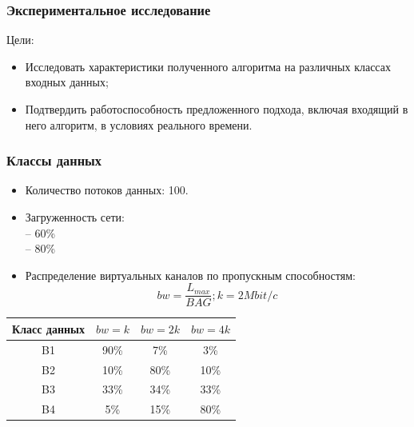 \documentclass[14pt, handout]{beamer}
\begin{document}
\begin{frame}
\frametitle{Экспериментальное исследование}

Цели:
\begin{itemize}
\item Исследовать характеристики полученного алгоритма на различных классах входных данных; 
\item Подтвердить работоспособность предложенного подхода, включая входящий в него алгоритм, в условиях реального времени.
\end{itemize}

\end{frame}


\begin{frame}
\frametitle{Классы данных}

\begin{itemize}
\item Количество потоков данных: 100.
\item Загруженность сети:\\
	-- 60\% \\
	-- 80\%
\item Распределение виртуальных каналов по пропускным способностям: $$bw = \frac{L_{max}}{BAG}; k = 2 Mbit/c$$
\end{itemize}
\begin{table}[h]
	\small
	\begin{center}
		\begin{tabular}{|c|c|c|c|}
			\hline
			Класс данных& $bw=k$& $bw=2k$& $bw=4k$\\
			\hline
			B1 & 90\% & 7\% & 3\% \\
			\hline
			B2 & 10\% & 80\% & 10\% \\
			\hline
			B3 & 33\% & 34\% & 33\% \\
			\hline
			B4 & 5\% & 15\% & 80\% \\
			\hline
		\end{tabular}
	\end{center}
\end{table}

\end{frame}
\end{document}
